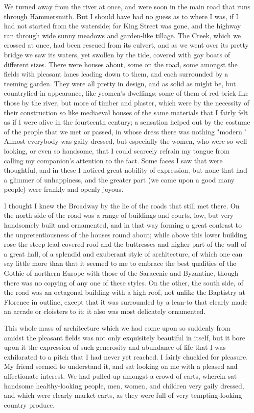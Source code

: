 We turned away from the river at once, and were soon in the main road
that runs through Hammersmith. But I should have had no guess as to
where I was, if I had not started from the waterside; for King Street
was gone, and the highway ran through wide sunny meadows and garden-like
tillage. The Creek, which we crossed at once, had been rescued from its
culvert, and as we went over its pretty bridge we saw its waters, yet
swollen by the tide, covered with gay boats of different sizes. There
were houses about, some on the road, some amongst the fields with
pleasant lanes leading down to them, and each surrounded by a teeming
garden. They were all pretty in design, and as solid as might be, but
countryfied in appearance, like yeomen's dwellings; some of them of red
brick like those by the river, but more of timber and plaster, which
were by the necessity of their construction so like mediaeval houses of
the same materials that I fairly felt as if I were alive in the
fourteenth century; a sensation helped out by the costume of the people
that we met or passed, in whose dress there was nothing "modern." Almost
everybody was gaily dressed, but especially the women, who were so
well-looking, or even so handsome, that I could scarcely refrain my
tongue from calling my companion's attention to the fact. Some faces I
saw that were thoughtful, and in these I noticed great nobility of
expression, but none that had a glimmer of unhappiness, and the greater
part (we came upon a good many people) were frankly and openly joyous.

I thought I knew the Broadway by the lie of the roads that still met
there. On the north side of the road was a range of buildings and
courts, low, but very handsomely built and ornamented, and in that way
forming a great contrast to the unpretentiousness of the houses round
about; while above this lower building rose the steep lead-covered roof
and the buttresses and higher part of the wall of a great hall, of a
splendid and exuberant style of architecture, of which one can say
little more than that it seemed to me to embrace the best qualities of
the Gothic of northern Europe with those of the Saracenic and Byzantine,
though there was no copying of any one of these styles. On the other,
the south side, of the road was an octagonal building with a high roof,
not unlike the Baptistry at Florence in outline, except that it was
surrounded by a lean-to that clearly made an arcade or cloisters to it:
it also was most delicately ornamented.

This whole mass of architecture which we had come upon so suddenly from
amidst the pleasant fields was not only exquisitely beautiful in itself,
but it bore upon it the expression of such generosity and abundance of
life that I was exhilarated to a pitch that I had never yet reached. I
fairly chuckled for pleasure. My friend seemed to understand it, and sat
looking on me with a pleased and affectionate interest. We had pulled up
amongst a crowd of carts, wherein sat handsome healthy-looking people,
men, women, and children very gaily dressed, and which were clearly
market carts, as they were full of very tempting-looking country
produce.

